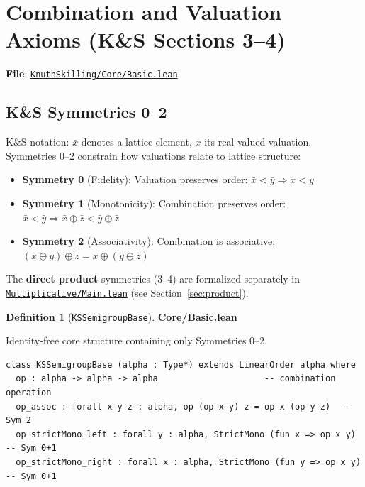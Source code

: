\documentclass[11pt]{article}
\theoremstyle{definition}
\newtheorem{definition}[theorem]{Definition}
\theoremstyle{remark}
\begin{document}
\section{Combination and Valuation Axioms (K\&S Sections 3--4)}

\textbf{File}: \href{https://github.com/zariuq/ks-foundations-of-inference/blob/main/KnuthSkilling/Core/Basic.lean}{\texttt{KnuthSkilling/Core/Basic.lean}}

\subsection{K\&S Symmetries 0--2}

K\&S notation: $\bar{x}$ denotes a lattice element, $x$ its real-valued valuation.
Symmetries 0--2 constrain how valuations relate to lattice structure:
\begin{itemize}
\item \textbf{Symmetry 0} (Fidelity): Valuation preserves order: $\bar{x} < \bar{y} \Rightarrow x < y$
\item \textbf{Symmetry 1} (Monotonicity): Combination preserves order: $\bar{x} < \bar{y} \Rightarrow \bar{x} \oplus \bar{z} < \bar{y} \oplus \bar{z}$
\item \textbf{Symmetry 2} (Associativity): Combination is associative: $(\bar{x} \oplus \bar{y}) \oplus \bar{z} = \bar{x} \oplus (\bar{y} \oplus \bar{z})$
\end{itemize}

The \textbf{direct product} symmetries (3--4) are formalized separately in \href{https://github.com/zariuq/ks-foundations-of-inference/blob/main/KnuthSkilling/Multiplicative/Main.lean}{\texttt{Multiplicative/Main.lean}} (see Section~\ref{sec:product}).

\begin{definition}[\href{https://github.com/zariuq/ks-foundations-of-inference/blob/main/KnuthSkilling/Core/Basic.lean}{\texttt{KSSemigroupBase}}]
\textbf{\href{https://github.com/zariuq/ks-foundations-of-inference/blob/main/KnuthSkilling/Core/Basic.lean}{Core/Basic.lean}}

Identity-free core structure containing only Symmetries 0--2.
\end{definition}

\begin{lstlisting}[caption={Identity-free semigroup base}]
class KSSemigroupBase (alpha : Type*) extends LinearOrder alpha where
  op : alpha -> alpha -> alpha                     -- combination operation
  op_assoc : forall x y z : alpha, op (op x y) z = op x (op y z)  -- Sym 2
  op_strictMono_left : forall y : alpha, StrictMono (fun x => op x y)   -- Sym 0+1
  op_strictMono_right : forall x : alpha, StrictMono (fun y => op x y)  -- Sym 0+1
\end{lstlisting}
\end{document}
